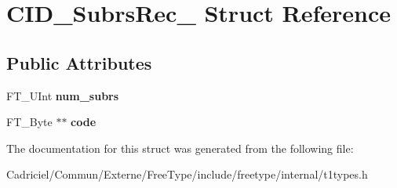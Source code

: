 \hypertarget{struct_c_i_d___subrs_rec__}{}\section{C\+I\+D\+\_\+\+Subrs\+Rec\+\_\+ Struct Reference}
\label{struct_c_i_d___subrs_rec__}
\subsection*{Public Attributes}
\begin{DoxyCompactItemize}
\item 
F\+T\+\_\+\+U\+Int {\bfseries num\+\_\+subrs}\hypertarget{struct_c_i_d___subrs_rec___a3abd23388e2e0f4888f826a993953c7e}{}\label{struct_c_i_d___subrs_rec___a3abd23388e2e0f4888f826a993953c7e}

\item 
F\+T\+\_\+\+Byte $\ast$$\ast$ {\bfseries code}\hypertarget{struct_c_i_d___subrs_rec___a1a4f0a4e514492fccaf81d7ede6c4e08}{}\label{struct_c_i_d___subrs_rec___a1a4f0a4e514492fccaf81d7ede6c4e08}

\end{DoxyCompactItemize}


The documentation for this struct was generated from the following file\+:\begin{DoxyCompactItemize}
\item 
Cadriciel/\+Commun/\+Externe/\+Free\+Type/include/freetype/internal/t1types.\+h\end{DoxyCompactItemize}
